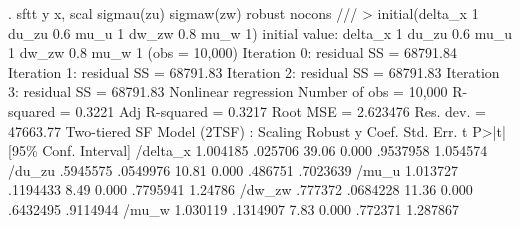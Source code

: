 . sftt y x, scal sigmau(zu) sigmaw(zw) robust nocons ///
>          initial(delta_x 1 du_zu 0.6 mu_u 1 dw_zw 0.8 mu_w 1)
initial value: delta_x 1 du_zu 0.6 mu_u 1 dw_zw 0.8 mu_w 1
(obs = 10,000)
{\smallskip}
Iteration 0:  residual SS =  68791.84
Iteration 1:  residual SS =  68791.83
Iteration 2:  residual SS =  68791.83
Iteration 3:  residual SS =  68791.83
{\smallskip}
{\smallskip}
Nonlinear regression                                Number of obs =     10,000
                                                    R-squared     =     0.3221
                                                    Adj R-squared =     0.3217
                                                    Root MSE      =   2.623476
                                                    Res. dev.     =   47663.77
{\smallskip}
Two-tiered SF Model (2TSF) : Scaling
             {\VBAR}               Robust
           y {\VBAR}      Coef.   Std. Err.      t    P>|t|     [95\% Conf. Interval]
    /delta_x {\VBAR}   1.004185    .025706    39.06   0.000     .9537958    1.054574
      /du_zu {\VBAR}   .5945575   .0549976    10.81   0.000      .486751    .7023639
       /mu_u {\VBAR}   1.013727   .1194433     8.49   0.000     .7795941     1.24786
      /dw_zw {\VBAR}    .777372   .0684228    11.36   0.000     .6432495    .9114944
       /mu_w {\VBAR}   1.030119   .1314907     7.83   0.000      .772371    1.287867
